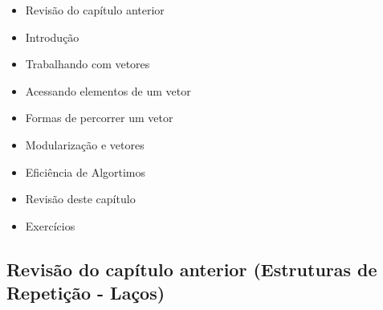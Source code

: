 \documentclass[12pt,a4paper]{article}
\providecommand{\tightlist}{%
      \setlength{\itemsep}{0pt}\setlength{\parskip}{0pt}}
\begin{document}
\begin{itemize}
\tightlist
\item
  Revisão do capítulo anterior
\item
  Introdução
\item
  Trabalhando com vetores
\item
  Acessando elementos de um vetor
\item
  Formas de percorrer um vetor
\item
  Modularização e vetores
\item
  Eficiência de Algortimos
\item
  Revisão deste capítulo
\item
  Exercícios
\end{itemize}

    \hypertarget{revisuxe3o-do-capuxedtulo-anterior-estruturas-de-repetiuxe7uxe3o---lauxe7os}{%
\subsection{Revisão do capítulo anterior (Estruturas de Repetição -
Laços)}\label{revisuxe3o-do-capuxedtulo-anterior-estruturas-de-repetiuxe7uxe3o---lauxe7os}}
\end{document}
